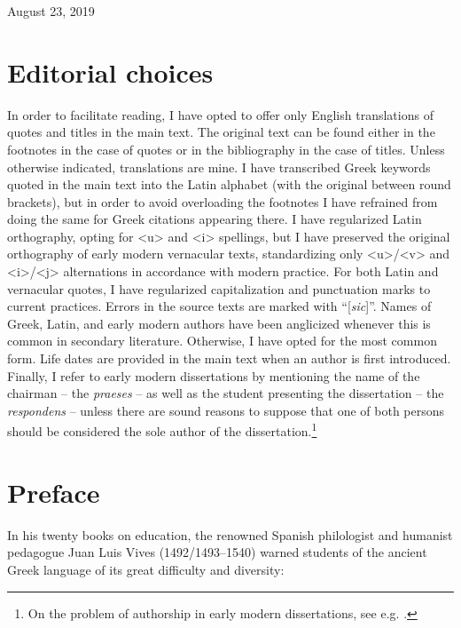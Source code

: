 \documentclass[output=paper]{langsci/langscibook}
\begin{document}
August 23, 2019

\section{Editorial choices}
\hypertarget{Toc19704800}{}
In order to facilitate reading, I have opted to offer only English translations of quotes and titles in the main text. The original text can be found either in the footnotes in the case of quotes or in the bibliography in the case of titles. Unless otherwise indicated, translations are mine. I have transcribed Greek keywords quoted in the main text into the Latin alphabet (with the original between round brackets), but in order to avoid overloading the footnotes I have refrained from doing the same for Greek citations appearing there. I have regularized Latin orthography, opting for <u> and <i> spellings, but I have preserved the original orthography of early modern vernacular texts, standardizing only <u>/<v> and <i>/<j> alternations in accordance with modern practice. For both Latin and vernacular quotes, I have regularized capitalization and punctuation marks to current practices. Errors in the source texts are marked with “[\textit{sic}]”. Names of Greek, Latin, and early modern authors have been anglicized whenever this is common in secondary literature. Otherwise, I have opted for the most common form. Life dates are provided in the main text when an author is first introduced. Finally, I refer to early modern dissertations by mentioning the name of the chairman – the \textit{praeses} – as well as the student presenting the dissertation – the \textit{respondens} – unless there are sound reasons to suppose that one of both persons should be considered the sole author of the dissertation.\footnote{On the problem of authorship in early modern dissertations, see e.g. \citet{Considine2008b}.}

\section{Preface}
\hypertarget{Toc19704801}{}
In his twenty books on education, the renowned Spanish philologist and humanist pedagogue Juan Luis Vives (1492/1493–1540) warned students of the ancient Greek language of its great difficulty and diversity:
\end{document}

